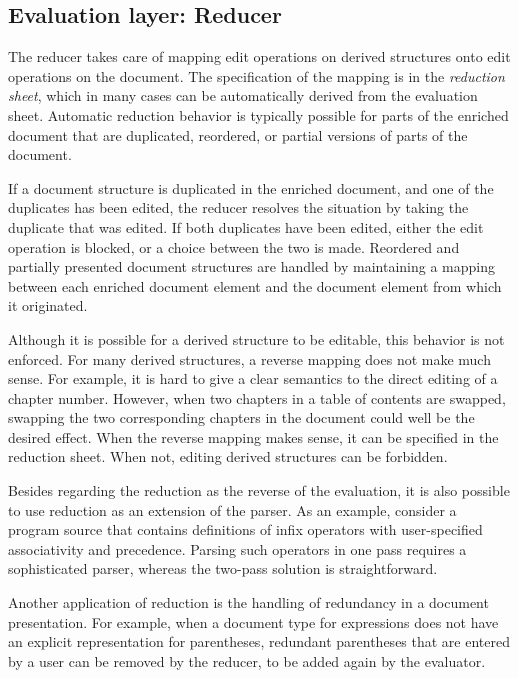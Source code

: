 %																
\subsection{Evaluation layer: Reducer} \label{sect:reducer}

The reducer takes care of mapping edit operations on derived structures onto edit operations on the document. The specification of the mapping is in the {\em reduction sheet}, which in many cases can be automatically derived from the evaluation sheet. Automatic reduction behavior is typically possible for parts of the enriched document that are duplicated, reordered, or partial versions of parts of the document. 

If a document structure is duplicated in the enriched document, and one of the duplicates has been edited, the reducer resolves the situation by taking the duplicate that was edited. If both duplicates have been edited, either the edit operation is blocked, or a choice between the two is made. Reordered and partially presented document structures are handled by maintaining a mapping between each enriched document element and the document element from which it originated.

Although it is possible for a derived structure to be editable, this behavior is not enforced. For many derived structures, a reverse mapping does not make much sense. For example, it is hard to give a clear semantics to the direct editing of a chapter number. However, when two chapters in a table of contents are swapped, swapping the two corresponding chapters in the document could well be the desired effect. When the reverse mapping makes sense, it can be specified in the reduction sheet. When not, editing derived structures can be forbidden.

Besides regarding the reduction as the reverse of the evaluation, it is also possible to use reduction as an extension of the parser. As an example, consider a program source that contains definitions of infix operators with user-specified associativity and precedence. Parsing such operators in one pass requires a sophisticated parser, whereas the two-pass solution is straightforward.

Another application of reduction is the handling of redundancy in a document presentation. For example, when a document type for expressions does not have an explicit representation for parentheses, redundant parentheses that are entered by a user can be removed by the reducer, to be added again by the evaluator.

